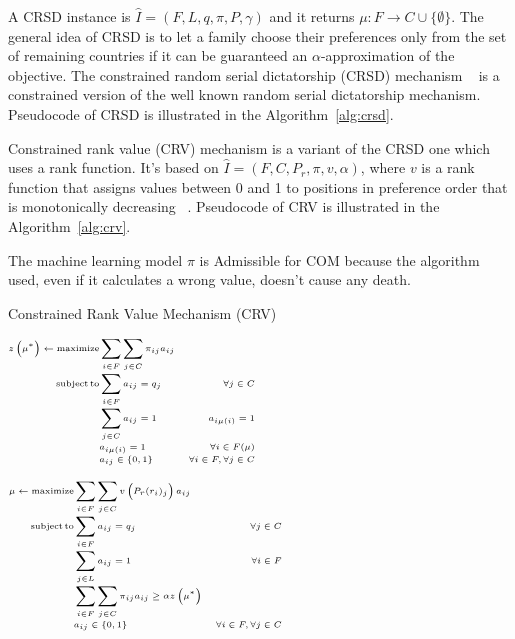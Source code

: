 A CRSD instance is \(\hat {I} = (F, L, q, \pi, P, \gamma)\) and it returns \(\mu : F \rightarrow C \cup \{\emptyset\}\).
The general idea of CRSD is to let a family choose their preferences only from the set of remaining countries if it can be guaranteed an \(\alpha\)-approximation of the objective.
The constrained random serial dictatorship (CRSD) mechanism ~\cite{bansak_2018} is a constrained version of the well known random serial dictatorship mechanism.
Pseudocode of CRSD is illustrated in the Algorithm~\ref{alg:crsd}.

Constrained rank value (CRV) mechanism is a variant of the CRSD one which uses a rank function.
It's based on \(\hat {I} = (F, C, P_r, \pi, v, \alpha)\), where \(v\) is a rank function that assigns values between 0 and 1 to positions in preference order that is monotonically decreasing ~\cite{olbergml}.
Pseudocode of CRV is illustrated in the Algorithm~\ref{alg:crv}.

The machine learning model \(\pi\) is Admissible for COM because the algorithm used, even if it calculates a wrong value, doesn’t cause any death.

\begin{algorithm}
    \caption{Constrained Rank Value Mechanism (CRV)}\label{alg:crv}
    \KwResult{\(\mu\)}
    \(\tiny
        \begin{aligned}
            z \left( \mu^* \right) \leftarrow \operatorname{maximize} & \sum_{i \in F} \sum_{j \in C} \pi_{i j} a_{i j} \\[-1mm]
            \operatorname {subject}\operatorname{to} & \sum_{i \in F} a_{i j}=q_{j} & \forall j \in C \\[-1mm]
            & \sum_{j \in C} a_{i j}=1 & a_{i \mu(i)}=1 \\[-1mm]
            & a_{i\mu (i)} = 1 &  \forall i \in F(\mu) \\[-1mm]
            & a_{i j} \in\{0,1\} & \forall i \in F, \forall j \in C
        \end{aligned}
    \)%

    \(\tiny
        \begin{aligned}
            \mu \leftarrow \operatorname{maximize} & \sum_{i \in F} \sum_{j \in C} v\left(P_r(r_i)_j\right) a_{i j} \\[-1mm]
            \operatorname {subject}\operatorname{to} & \sum_{i \in F} a_{i j}=q_{j} & \forall j \in C \\[-1mm]
            & \sum_{j \in L} a_{i j}=1 & \forall i \in F \\[-1mm]
            & \sum_{i \in F} \sum_{j \in C} \pi_{i j} a_{i j} \geq \alpha z \left( \mu^* \right) \\[-1mm]
            & a_{i j} \in\{0,1\} & \forall i \in F, \forall j \in C
        \end{aligned}
    \)%

\end{algorithm}

